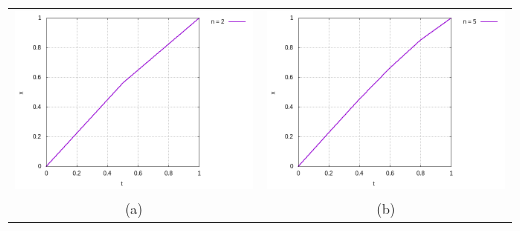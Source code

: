 \documentclass[12pt]{article}
\begin{document}
    	\begin{center}
            \begin{tabular}{cc}
                \includegraphics[scale=0.5]{Plots/plot_n_2.png} & \includegraphics[scale=0.5]{Plots/plot_n_5.png}\\
                (a) & (b)\\

\end{tabular}
\end{center}
\end{document}
